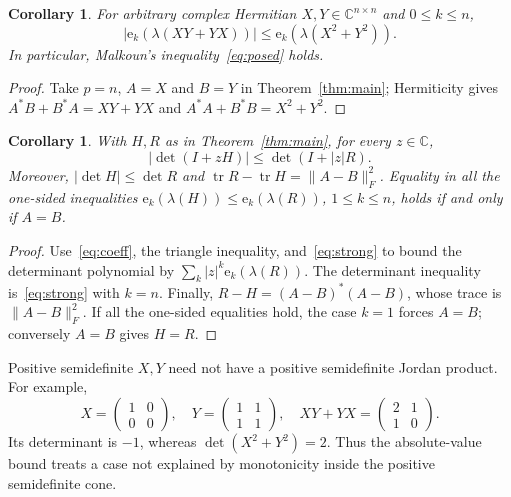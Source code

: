 \documentclass[11pt]{article}
\newtheorem{corollary}[theorem]{Corollary}
\newcommand{\CC}{\mathbb C}
\newcommand{\ee}{\mathrm e}
\newcommand{\tr}{\operatorname{tr}}
\newcommand{\Id}{I}
\begin{document}
\begin{corollary}\label{cor:hermitian}
For arbitrary complex Hermitian $X,Y\in\CC^{n\times n}$ and $0\leq k\leq n$,
\[
 \bigl|\ee_k(\lambda(XY+YX))\bigr|\leq
 \ee_k(\lambda(X^2+Y^2)).
\]
In particular, Malkoun's inequality~\eqref{eq:posed} holds.
\end{corollary}
\begin{proof}
Take $p=n$, $A=X$ and $B=Y$ in Theorem~\ref{thm:main}; Hermiticity gives
$A^*B+B^*A=XY+YX$ and $A^*A+B^*B=X^2+Y^2$.
\end{proof}

\begin{corollary}\label{cor:det}
With $H,R$ as in Theorem~\ref{thm:main}, for every $z\in\CC$,
\[
 |\det(\Id+zH)|\leq\det(\Id+|z|R).
\]
Moreover, $|\det H|\leq\det R$ and
$\tr R-\tr H=\|A-B\|_F^2$.
Equality in all the one-sided inequalities
$\ee_k(\lambda(H))\leq\ee_k(\lambda(R))$, $1\leq k\leq n$,
holds if and only if $A=B$.
\end{corollary}
\begin{proof}
Use~\eqref{eq:coeff}, the triangle inequality, and~\eqref{eq:strong}
to bound the determinant polynomial by
$\sum_k |z|^k\ee_k(\lambda(R))$.
The determinant inequality is~\eqref{eq:strong} with $k=n$.
Finally,
$R-H=(A-B)^*(A-B)$, whose trace is $\|A-B\|_F^2$.
If all the one-sided equalities hold, the case $k=1$ forces $A=B$;
conversely $A=B$ gives $H=R$.
\end{proof}

Positive semidefinite $X,Y$ need not have a positive semidefinite Jordan product.
For example,
\[
 X=\begin{pmatrix}1&0\\0&0\end{pmatrix},\quad
 Y=\begin{pmatrix}1&1\\1&1\end{pmatrix},\quad
 XY+YX=\begin{pmatrix}2&1\\1&0\end{pmatrix}.
\]
Its determinant is $-1$, whereas $\det(X^2+Y^2)=2$.
Thus the absolute-value bound treats a case not explained by monotonicity
inside the positive semidefinite cone.
\end{document}

